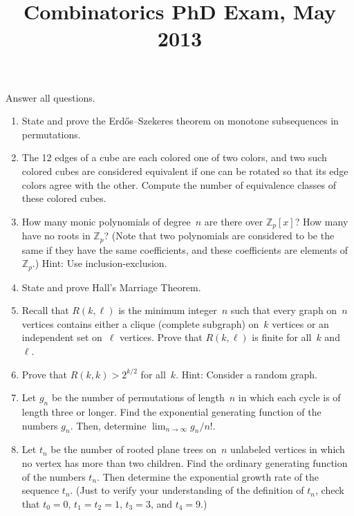 \documentclass[11pt,letterpaper]{article}
\title{Combinatorics PhD Exam, May 2013}
\author{}
\date{}
\newenvironment{examproblems}[2]{%
  \def\ProblemHeadingTag{#2}%
  \AssignTaggingSocketPlug{block/list/label}{examproblem}%
  \begin{enumerate}%
  \setcounter{enumi}{#1}%
  \renewcommand{\labelenumi}{\textbf{\theenumi.}}%
  \setlength{\topsep}{0.35em}%
  \setlength{\partopsep}{0pt}%
  \setlength{\itemsep}{0.48em}%
  \setlength{\parsep}{0.18em}%
}{\end{enumerate}}
\newenvironment{examinstructions}{%
  \par\begingroup\itshape
}{%
  \par\endgroup\vspace{0.18em}
}
\begin{document}
\maketitle
\thispagestyle{empty}
\begin{examinstructions}
Answer all questions.
\end{examinstructions}
\begin{examproblems}{0}{H2}
\def\ProblemHeadingText{Problem 1.}
\item
State and prove the Erdős–Szekeres theorem on monotone subsequences in permutations.
\def\ProblemHeadingText{Problem 2.}
\item
The 12 edges of a cube are each colored one of two colors, and two such colored cubes are considered equivalent if one can be rotated so that its edge colors agree with the other. Compute the number of equivalence classes of these colored cubes.
\def\ProblemHeadingText{Problem 3.}
\item
How many monic polynomials of degree~\(n\) are there over \(\mathbb{Z}_p[x]\)? How many have no roots in \(\mathbb{Z}_p\)? (Note that two polynomials are considered to be the same if they have the same coefficients, and these coefficients are elements of \(\mathbb{Z}_p\).) Hint: Use inclusion-exclusion.
\def\ProblemHeadingText{Problem 4.}
\item
State and prove Hall’s Marriage Theorem.
\def\ProblemHeadingText{Problem 5.}
\item
Recall that \(R(k,\ell)\) is the minimum integer~\(n\) such that every graph on~\(n\) vertices contains either a clique (complete subgraph) on~\(k\) vertices or an independent set on~\(\ell\) vertices. Prove that \(R(k,\ell)\) is finite for all~\(k\) and~\(\ell\).
\def\ProblemHeadingText{Problem 6.}
\item
Prove that \(R(k,k)>2^{k/2}\) for all~\(k\). Hint: Consider a random graph.
\def\ProblemHeadingText{Problem 7.}
\item
Let \(g_n\) be the number of permutations of length~\(n\) in which each cycle is of length three or longer. Find the exponential generating function of the numbers \(g_n\). Then, determine \(\lim_{n\to\infty} g_n/n!\).
\def\ProblemHeadingText{Problem 8.}
\item
Let \(t_n\) be the number of rooted plane trees on~\(n\) unlabeled vertices in which no vertex has more than two children. Find the ordinary generating function of the numbers \(t_n\). Then determine the exponential growth rate of the sequence \(t_n\). (Just to verify your understanding of the definition of \(t_n\), check that \(t_0=0\), \(t_1=t_2=1\), \(t_3=3\), and \(t_4=9\).)
\end{examproblems}
\end{document}
